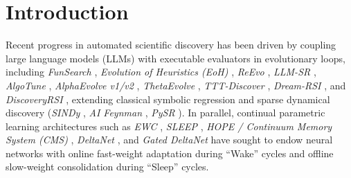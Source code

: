 \documentclass[11pt,a4paper]{article}
\begin{document}
\begin{abstract}
(4) Retains $\mathbf{97.63\%}$ Domain-1 accuracy across 5 sequential domains ($97.82\%$ 5-domain mean vs.\ $51.09\%$ in Vanilla SLEEP), reduces NREM dead-end consolidation MSE by $\mathbf{161.15\times}$ ($15.8726 \to 0.0985$) via SDPO self-teaching with $\mathbf{0\%}$ breakdown up to $25\%$ adversarial corruption and $\mathbf{100\%}$ safe fallback at $60\%$ corruption, cracks depth-3 nonlinear dynamical laws with $\mathbf{R^2_{\text{OOS}} = 1.0000 \pm 0.0000}$ across 10 seeds (vs.\ $0.0400 \pm 0.0717$ in flat depth-2 distillation and $0.0251 \pm 0.0793$ in \emph{SINDy} STLSQ), achieves $\mathbf{2.30\times}$ lower Blind Vault MSE than \emph{SINDy} on stochastic control ($0.00535$ vs.\ $0.01232$ across 10 seeds), and outperforms \emph{Gated DeltaNet} by $\mathbf{13.5\times}$ on opposite-sign cancellation spikes and $\mathbf{101.9\times}$ on target-outlier fast-weight stability.
\end{abstract}

\section{Introduction}

Recent progress in automated scientific discovery has been driven by coupling large language models (LLMs) with executable evaluators in evolutionary loops, including \emph{FunSearch} \cite{funsearch2024}, \emph{Evolution of Heuristics (EoH)} \cite{eoh2024}, \emph{ReEvo} \cite{reevo2024}, \emph{LLM-SR} \cite{llmsr2024}, \emph{AlgoTune} \cite{algotune2025}, \emph{AlphaEvolve v1/v2} \cite{alphaevolve2025,alphaevolve2_2025}, \emph{ThetaEvolve} \cite{thetaevolve2025}, \emph{TTT-Discover} \cite{tttdiscover2026}, \emph{Dream-RSI} \cite{dreamrsi2026}, and \emph{DiscoveryRSI} \cite{discoveryrsi2026}, extending classical symbolic regression and sparse dynamical discovery (\emph{SINDy} \cite{brunton2016}, \emph{AI Feynman} \cite{udrescu2020}, \emph{PySR} \cite{cranmer2020}). In parallel, continual parametric learning architectures such as \emph{EWC} \cite{kirkpatrick2017}, \emph{SLEEP} \cite{sleep2026}, \emph{HOPE / Continuum Memory System (CMS)} \cite{hope2025}, \emph{DeltaNet} \cite{yang2024}, and \emph{Gated DeltaNet} \cite{yang2025} have sought to endow neural networks with online fast-weight adaptation during ``Wake'' cycles and offline slow-weight consolidation during ``Sleep'' cycles.
\end{document}

